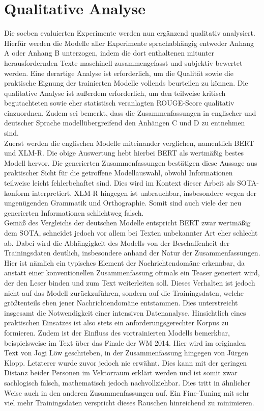 \section{Qualitative Analyse}
\noindent
Die soeben evaluierten Experimente werden nun ergänzend qualitativ analysiert. Hierfür werden die Modelle aller Experimente sprachabhängig entweder Anhang A oder Anhang B unterzogen, indem die dort enthaltenen mitunter herausfordernden Texte maschinell zusammengefasst und subjektiv bewertet werden. Eine derartige Analyse ist erforderlich, um die Qualität sowie die praktische Eignung der trainierten Modelle vollends beurteilen zu können. Die qualitative Analyse ist außerdem erforderlich, um den teilweise kritisch begutachteten sowie eher statistisch veranlagten \ac{ROUGE}-Score qualitativ einzuordnen. Zudem sei bemerkt, dass die Zusammenfassungen in englischer und deutscher Sprache modellübergreifend den Anhängen C und D zu entnehmen sind.\\

\noindent
Zuerst werden die englischen Modelle miteinander verglichen, namentlich \ac{BERT} und \ac{XLM-R}. Die obige Auswertung hebt hierbei \ac{BERT} als wertmäßig bestes Modell hervor. Die generierten Zusammenfassungen bestätigen diese Aussage aus praktischer Sicht für die getroffene Modellauswahl, obwohl Informationen teilweise leicht fehlerbehaftet sind. Dies wird im Kontext dieser Arbeit als \ac{SOTA}-konform interpretiert. \ac{XLM-R} hingegen ist unbrauchbar, insbesondere wegen der ungenügenden Grammatik und Orthographie. Somit sind auch viele der neu generierten Informationen schlichtweg falsch.\\

\noindent
Gemäß des Vergleichs der deutschen Modelle entspricht \ac{BERT} zwar wertmäßig dem \ac{SOTA}, schneidet jedoch vor allem bei Texten unbekannter Art eher schlecht ab. Dabei wird die Abhängigkeit des Modells von der Beschaffenheit der Trainingsdaten deutlich, insbesondere anhand der Natur der Zusammenfassungen. Hier ist nämlich ein typisches Element der Nachrichtendomäne erkennbar, da anstatt einer konventionellen Zusammenfassung oftmals ein Teaser generiert wird, der den Leser binden und zum Text weiterleiten soll. Dieses Verhalten ist jedoch nicht auf das Modell zurückzuführen, sondern auf die Trainingsdaten, welche größtenteils eben jener Nachrichtendomäne entstammen. Dies unterstreicht insgesamt die Notwendigkeit einer intensiven Datenanalyse. Hinsichtlich eines praktischen Einsatzes ist also stets ein anforderungsgerechter Korpus zu formieren. Zudem ist der Einfluss des vortrainierten Modells bemerkbar, beispielsweise im Text über das Finale der WM 2014. Hier wird im originalen Text von Jogi Löw geschrieben, in der Zusammenfassung hingegen von Jürgen Klopp. Letzterer wurde zuvor jedoch nie erwähnt. Dies kann mit der geringen Distanz beider Personen im Vektorraum erklärt werden und ist somit zwar sachlogisch falsch, mathematisch jedoch nachvollziehbar. Dies tritt in ähnlicher Weise auch in den anderen Zusammenfassungen auf. Ein Fine-Tuning mit sehr viel mehr Trainingsdaten verspricht dieses Rauschen hinreichend zu minimieren.
\newpage

